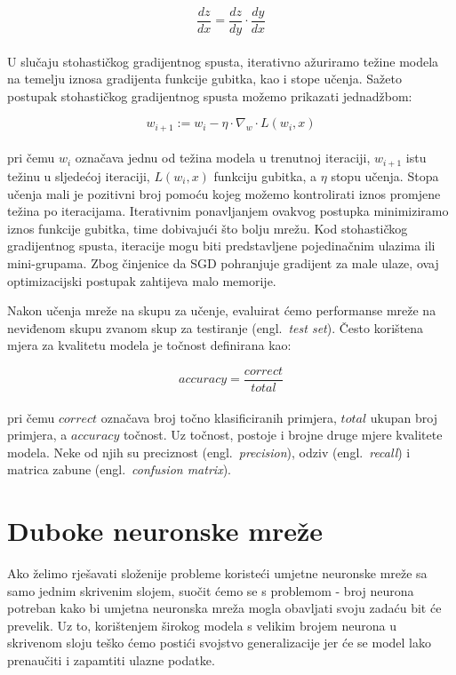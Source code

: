 \documentclass[times, utf8, zavrsni, numeric]{fer}
\begin{document}
\begin{equation}
    \frac{dz}{dx} = \frac{dz}{dy} \cdot \frac{dy}{dx}
    \label{eq:chain_rule}
\end{equation}
\\
U slučaju stohastičkog gradijentnog spusta, iterativno ažuriramo težine modela na temelju iznosa gradijenta funkcije gubitka, kao i stope učenja. Sažeto postupak stohastičkog gradijentnog spusta možemo prikazati jednadžbom:

\begin{equation}
    w_{i+1} := w_{i} - \eta \cdot \nabla_{w} \cdot L(w_{i}, x)
    \label{eq:sgd}
\end{equation}
\\
pri čemu $w_{i}$ označava jednu od težina modela u trenutnoj iteraciji, $w_{i+1}$ istu težinu u sljedećoj iteraciji, $L(w_{i}, x)$ funkciju gubitka, a $\eta$ stopu učenja. 
Stopa učenja mali je pozitivni broj pomoću kojeg možemo kontrolirati iznos promjene težina po iteracijama. Iterativnim ponavljanjem ovakvog postupka minimiziramo iznos funkcije gubitka, time dobivajući što bolju mrežu.
Kod stohastičkog gradijentnog spusta, iteracije mogu biti predstavljene pojedinačnim ulazima ili mini-grupama. Zbog činjenice da SGD pohranjuje gradijent za male ulaze, ovaj optimizacijski postupak zahtijeva malo memorije.

Nakon učenja mreže na skupu za učenje, evaluirat ćemo performanse mreže na neviđenom skupu zvanom skup za testiranje (engl.\ \textit{test set}). Često korištena mjera za kvalitetu modela je točnost definirana kao:

\begin{equation}
    accuracy = \frac{correct}{total}
    \label{eq:accuracy}
\end{equation}
\\
pri čemu $correct$ označava broj točno klasificiranih primjera, $total$ ukupan broj primjera, a $accuracy$ točnost.
Uz točnost, postoje i brojne druge mjere kvalitete modela. Neke od njih su preciznost (engl.\ \textit{precision}), odziv (engl.\ \textit{recall}) i matrica zabune (engl.\ \textit{confusion matrix}).

\section{Duboke neuronske mreže}
Ako želimo rješavati složenije probleme koristeći umjetne neuronske mreže sa samo jednim skrivenim slojem, suočit ćemo se s problemom - broj neurona potreban kako bi umjetna neuronska mreža mogla obavljati svoju zadaću bit će prevelik.
Uz to, korištenjem širokog modela s velikim brojem neurona u skrivenom sloju teško ćemo postići svojstvo generalizacije jer će se model lako prenaučiti i zapamtiti ulazne podatke. 
\end{document}
